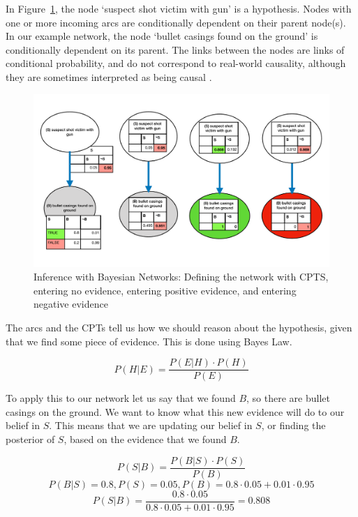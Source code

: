 \documentclass[11pt]{article}
\begin{document}
In Figure~\ref{exampleBN}, the node `suspect shot victim with gun' is a hypothesis. Nodes with one or more incoming arcs are conditionally dependent on their parent node(s). In our example network, the node `bullet casings found on the ground' is conditionally dependent on its parent. The links between the nodes are links of conditional probability, and do not correspond to real-world causality, although they are sometimes interpreted as being causal \citep{Dawid2008}.

\begin{figure}[htbp]
\begin{center}
\includegraphics[width=\linewidth]{images/basicBayes}
\caption{Inference with Bayesian Networks: Defining the network with CPTS, entering no evidence, entering positive evidence, and entering negative evidence}
\label{exampleBN}
\end{center}
\end{figure}

The arcs and the CPTs tell us how we should reason about the hypothesis, given that we find some piece of evidence. This is done using Bayes Law.

\[ P(H | E) =  \frac{P(E | H) \cdot P(H)}{P(E)}\]


To apply this to our network let us say that we found $B$, so there are bullet casings on the ground. We want to know what this new evidence will do to our belief in $S$. This means that we are updating our belief in $S$, or finding the posterior of $S$, based on the evidence that we found $B$.

\[ P(S | B) =  \frac{P(B | S) \cdot P(S)}{P(B)}\]
\[ P(B | S) = 0.8, P(S) = 0.05, P(B) = 0.8 \cdot 0.05 + 0.01 \cdot 0.95\]
\[ P(S | B) =  \frac{0.8 \cdot 0.05}{0.8 \cdot 0.05 + 0.01 \cdot 0.95} = 0.808\]
\end{document}
